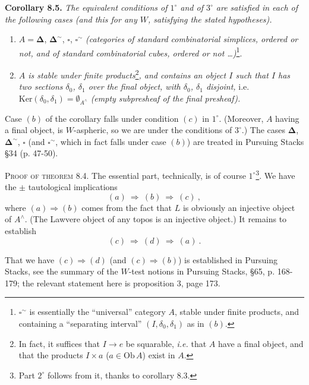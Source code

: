 \documentclass[11pt]{article}
\newcommand{\printedpage}[1]{\marginpar{\footnotesize p.~#1}}
\newcommand{\msp}[1]{\marginpar{\footnotesize [#1]}}
\newcommand{\Simp}{\boldsymbol{\Delta}}
\newcommand{\Cub}{\square}
\begin{document}
\textbf{Corollary 8.5.} \textit{The equivalent conditions of $1^\circ$ and of $3^\circ$ are satisfied in each of the following cases (and this for any $W$, satisfying the stated hypotheses).}
\begin{enumerate}[leftmargin=2.5em]
\item[a)] $A = \Simp$, $\Simp^{\sim}$, $\Cub$, $\Cub^{\sim}$ \textit{(categories of standard combinatorial simplices, ordered or not, and of standard combinatorial cubes, ordered or not \ldots)}\footnote[39]{$\Cub^{\sim}$ is essentially the ``universal'' category $A$, stable under finite products, and containing a ``separating interval'' $(I,\delta_0,\delta_1)$ as in $(b)$.}.
\item[b)] \textit{$A$ is stable under finite products}\footnote[40]{In fact, it suffices that $I \longrightarrow e$ be squarable, \textit{i.e.} that $A$ have a final object, and that the products $I \times a$ ($a \in \mathrm{Ob}\,A$) exist in $A$.}\textit{, and contains an object $I$ such that $I$ has two sections $\delta_0$, $\delta_1$ over the final object, with $\delta_0$, $\delta_1$ disjoint,} i.e. $\mathrm{Ker}(\delta_0,\delta_1) = \emptyset_{A^\wedge}$ \textit{(empty subpresheaf of the final presheaf).}
\end{enumerate}

\msp{page 108}

Case $(b)$ of the corollary falls under condition $(c)$ in $1^\circ$. (Moreover, $A$ having a final object, is $W$-aspheric, so we are under the conditions of $3^\circ$.) The cases $\Simp$, $\Simp^{\sim}$, $\Cub$ (and $\Cub^{\sim}$, which in fact falls under case $(b)$) are treated in Pursuing Stacks \S34 (p. 47-50).

\textsc{Proof of theorem} 8.4. The essential part, technically, is of course $1^\circ$\footnote[41]{Part $2^\circ$ follows from it, thanks to corollary 8.3.}. We have the $\pm$ tautological implications
\[
(a) \ \Longrightarrow\ (b) \ \Longrightarrow\ (c)\ ,
\]
where $(a) \Longrightarrow (b)$ comes from the fact that $L$ is obviously an injective object of $A^\wedge$. (The Lawvere object of any topos is an injective object.) It remains to establish
\[
(c) \ \Longrightarrow\ (d) \ \Longrightarrow\ (a)\ .
\]

\printedpage{60}

That we have $(c) \Longrightarrow (d)$ (and $(c) \Longrightarrow (b)$) is established in Pursuing Stacks, see the summary of the $W$-test notions in Pursuing Stacks, \S65, p. 168-179; the relevant statement here is proposition 3, page 173.
\end{document}
